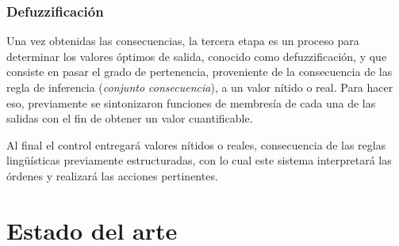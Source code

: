 \subsubsection*{Defuzzificación}
Una vez obtenidas las consecuencias, la tercera etapa es un proceso para determinar los valores
óptimos de salida, conocido como defuzzificación, y que consiste en pasar el grado de pertenencia,
proveniente de la consecuencia de las regla de inferencia (\textit{conjunto consecuencia}), a un valor nítido o real. Para hacer
eso, previamente se sintonizaron funciones de membresía de cada una de las salidas con el fin de
obtener un valor cuantificable. 



Al final el control entregará valores nítidos o reales, consecuencia de las reglas lingüísticas previamente
estructuradas, con lo cual este sistema interpretará las órdenes y realizará las acciones
pertinentes.





\newpage

\section{Estado del arte}\label{table:estadodelarte}

